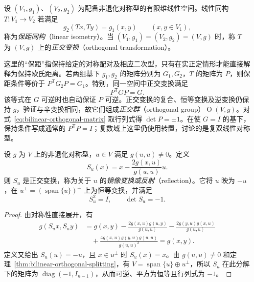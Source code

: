 \begin{definition}
\label{def:bilinear-isometry}
设 $(V_1,g_1)$、$(V_2,g_2)$ 为配备非退化对称型的有限维线性空间。线性同构 $T:V_1\to V_2$ 若满足
\[
    g_2(Tx,Ty)=g_1(x,y)\qquad(x,y\in V_1),
\]
称为\emph{保距同构}（linear isometry）。当 $(V_1,g_1)=(V_2,g_2)=(V,g)$ 时，称 $T$ 为 $(V,g)$ 上的\emph{正交变换}（orthogonal transformation）。
\end{definition}

这里的“保距”指保持给定的对称配对及相应二次型，只有在实正定情形才能直接解释为保持欧氏距离。若两组基下 $g_1,g_2$ 的矩阵分别为 $G_1,G_2$，$T$ 的矩阵为 $P$，则保距条件等价于 $P^{\mathsf T}G_2P=G_1$。特别，同一空间中正交变换满足
\begin{equation}
\label{eq:bilinear-orthogonal-matrix}
    P^{\mathsf T}GP=G.
\end{equation}
该等式在 $G$ 可逆时也自动保证 $P$ 可逆。正交变换的复合、恒等变换及逆变换仍保持 $g$，验证与辛变换相同，故它们组成\emph{正交群}（orthogonal group）$\operatorname{O}(V,g)$。对式~\eqref{eq:bilinear-orthogonal-matrix} 取行列式得 $\det P=\pm1$。在使 $G=I$ 的基下，保持条件写成通常的 $P^{\mathsf T}P=I$；复数域上这里仍使用转置，讨论的是复双线性对称型。

\begin{proposition}
\label{prop:bilinear-reflection}
设 $g$ 为 $V$ 上的非退化对称型，$u\in V$ 满足 $g(u,u)\neq0$。定义
\begin{equation}
\label{eq:bilinear-reflection}
    S_u(x)=x-\frac{2g(x,u)}{g(u,u)}u.
\end{equation}
则 $S_u$ 是正交变换，称为关于 $u$ 的\emph{镜像变换或反射}（reflection）。它将 $u$ 映为 $-u$，在 $u^\perp=(\operatorname{span}\{u\})^\perp$ 上为恒等变换，并满足
\[
    S_u^2=I,\qquad \det S_u=-1.
\]
\end{proposition}

\begin{proof}
由对称性直接展开，有
\[
\begin{aligned}
    g(S_ux,S_uy)
    &=g(x,y)-\frac{2g(x,u)g(u,y)}{g(u,u)}
      -\frac{2g(y,u)g(x,u)}{g(u,u)}\\
    &\quad+\frac{4g(x,u)g(y,u)g(u,u)}{g(u,u)^2}
    =g(x,y).
\end{aligned}
\]
定义又给出 $S_u(u)=-u$，且 $x\in u^\perp$ 时 $S_u(x)=x$。由 $g(u,u)\neq0$ 和定理~\ref{thm:bilinear-orthogonal-splitting}，有 $V=\operatorname{span}\{u\}\oplus u^\perp$，所以 $S_u$ 在此分解下的矩阵为 $\operatorname{diag}(-1,I_{n-1})$，从而可逆、平方为恒等且行列式为 $-1$。
\end{proof}

